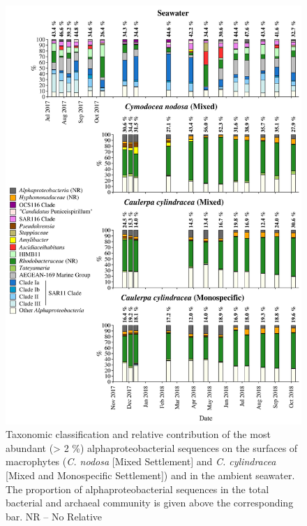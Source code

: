 \documentclass[12pt,]{article}
\begin{document}
\begin{figure}[H]

{\centering \includegraphics[width=0.85\linewidth]{../results/figures/alphaproteobacteria_bar_plot} 

}

\caption{Taxonomic classification and relative contribution of the most abundant (> 2 \si{\percent}) alphaproteobacterial sequences on the surfaces of macrophytes (\textit{C. nodosa} [Mixed Settlement] and \textit{C. cylindracea} [Mixed and Monospecific Settlement]) and in the ambient seawater. The proportion of alphaproteobacterial sequences in the total bacterial and archaeal community is given above the corresponding bar. NR -- No Relative\label{alpha}}\label{fig:unnamed-chunk-7}
\end{figure}
\end{document}
